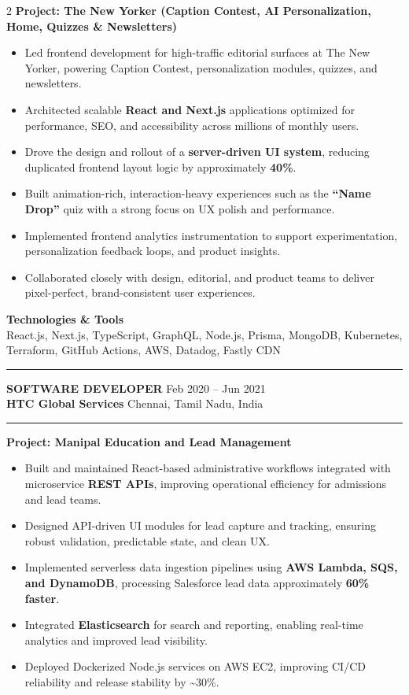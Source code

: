 \documentclass[10pt,a4paper]{article}
\newcommand{\blockdivider}{\vspace{0pt}\color{rulecolor}\rule{\linewidth}{0.5pt}\color{primary}\vspace{4pt}}
\newcommand{\roleheader}[4]{%
  \noindent
  \textbf{\MakeUppercase{#3}}%
  \hfill
  \textcolor{secondary}{#4}\\[0pt]

  \noindent
  \textbf{#1}%
  \hfill
  \textcolor{secondary}{#2}\\[0pt]
}
\newcommand{\roledivider}{%
  \vspace{-1pt}%
  {\color{rulecolor}\rule{\linewidth}{0.5pt}}%
  \vspace{2pt}%
}
\newcommand{\projecttitle}[1]{\textbf{#1}\par\vspace{2pt}}
\begin{document}
\begin{paracol}{2}
\projecttitle{Project: The New Yorker (Caption Contest, AI Personalization, Home, Quizzes \& Newsletters)}
\begin{itemize}
  \item Led frontend development for high-traffic editorial surfaces at The New Yorker, powering Caption Contest, personalization modules, quizzes, and newsletters.
  \item Architected scalable \textbf{React and Next.js} applications optimized for performance, SEO, and accessibility across millions of monthly users.
  \item Drove the design and rollout of a \textbf{server-driven UI system}, reducing duplicated frontend layout logic by approximately \textbf{40\%}.
  \item Built animation-rich, interaction-heavy experiences such as the \textbf{``Name Drop''} quiz with a strong focus on UX polish and performance.
  \item Implemented frontend analytics instrumentation to support experimentation, personalization feedback loops, and product insights.
  \item Collaborated closely with design, editorial, and product teams to deliver pixel-perfect, brand-consistent user experiences.
\end{itemize}

\textbf{Technologies \& Tools}\\
React.js, Next.js, TypeScript, GraphQL, Node.js, Prisma, MongoDB, Kubernetes, Terraform, GitHub Actions, AWS, Datadog, Fastly CDN

\blockdivider

\roleheader{HTC Global Services}{Chennai, Tamil Nadu, India}{Software Developer}{Feb 2020 -- Jun 2021}
\roledivider

\projecttitle{Project: Manipal Education and Lead Management}
\begin{itemize}
  \item Built and maintained React-based administrative workflows integrated with microservice \textbf{REST APIs}, improving operational efficiency for admissions and lead teams.
  \item Designed API-driven UI modules for lead capture and tracking, ensuring robust validation, predictable state, and clean UX.
  \item Implemented serverless data ingestion pipelines using \textbf{AWS Lambda, SQS, and DynamoDB}, processing Salesforce lead data approximately \textbf{60\% faster}.
  \item Integrated \textbf{Elasticsearch} for search and reporting, enabling real-time analytics and improved lead visibility.
  \item Deployed Dockerized Node.js services on AWS EC2, improving CI/CD reliability and release stability by \textasciitilde30\%.
\end{itemize}


\end{paracol}
\end{document}
